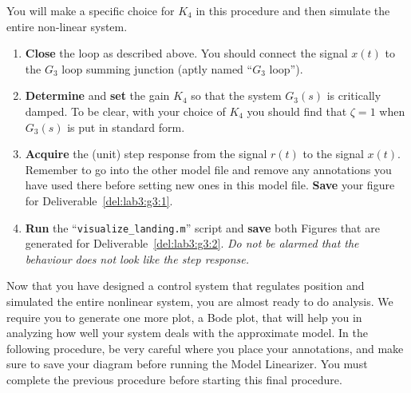 \begin{procedure}[label={proc:lab3:regulate}]
  You will make a specific choice for \(K_4\) in this procedure and then simulate the entire non-linear system.
  \begin{enumerate}[label={(\arabic*)}]
    \item{%
      \textbf{Close} the loop as described above.
      You should connect the signal \(x(t)\) to the \(G_3\) loop summing junction (aptly named ``\(G_3\) loop'').%
    }
    \item{%
      \textbf{Determine} and \textbf{set} the gain \(K_4\) so that the system \(G_3(s)\) is critically damped.
      To be clear, with your choice of \(K_4\) you should find that \(\zeta = 1\) when \(G_3(s)\) is put in standard form.%
    }
    \item{%
      \textbf{Acquire} the (unit) step response from the signal \(r(t)\) to the signal \(x(t).\)
      Remember to go into the other model file and remove any annotations you have used there before setting new ones in this model file.
      \textbf{Save} your figure for Deliverable~\ref{del:lab3:g3:1}.%
    }
    \item{%
      \textbf{Run} the ``\texttt{visualize\_landing.m}'' script and \textbf{save} both Figures that are generated for Deliverable~\ref{del:lab3:g3:2}.
      \emph{Do not be alarmed that the behaviour does not look like the step response.}%
    }
  \end{enumerate}
\end{procedure}
%
Now that you have designed a control system that regulates position and simulated the entire nonlinear system, you are almost ready to do analysis.
We require you to generate one more plot, a Bode plot, that will help you in analyzing how well your system deals with the approximate model.
In the following procedure, be very careful where you place your annotations, and make sure to save your diagram before running the Model Linearizer.
You must complete the previous procedure before starting this final procedure.
%
